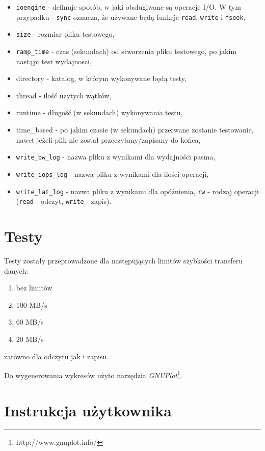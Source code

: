 \begin{itemize}
	\item \texttt{ioengine} - definuje sposób, w jaki obsługiwane są operacje I/O.
    W tym przypadku - \texttt{sync} oznacza, że używane będą funkcje \texttt{read},
    \texttt{write} i \texttt{fseek},
    \item \texttt{size} - rozmiar pliku testowego,
    \item \texttt{ramp\_time} - czas (sekundach) od stworzenia pliku testowego, po jakim nastąpi test
    wydajnosci,
    \item{directory} - katalog, w którym wykonywane będą testy,
    \item{thread} - ilość użytych wątków,
    \item{runtime} - długość (w sekundach) wykonywania testu,
    \item {time\_based} - po jakim czasie (w sekundach) przerwane zostanie testowanie, nawet
    jeżeli plik nie został przeczytany/zapisany do końca,
    \item \texttt{write\_bw\_log} - nazwa pliku z wynikami dla wydajności pasma,
    \item \texttt{write\_iops\_log} - nazwa pliku z wynikami dla ilości operacji,
    \item \texttt{write\_lat\_log} - nazwa pliku z wynikami dla opóźnienia,
    \texttt{rw} - rodzaj operacji (\texttt{read} - odczyt, \texttt{write} - zapis).
\end{itemize}

\section{Testy}

Testy zostały przeprowadzone dla następujących limitów szybkości transferu danych:
\begin{enumerate}
	\item bez limitów
	\item 100 MB/s
    \item 60 MB/s
    \item 20 MB/s
\end{enumerate}
zarówno dla odczytu jak i zapisu.

Do wygenerowania wykresów użyto narzędzia
\textit{GNUPlot}\footnote{http://www.gnuplot.info/}.

\section{Instrukcja użytkownika}

